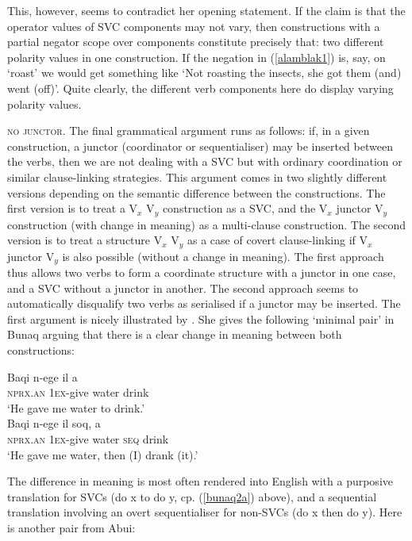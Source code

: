This, however, seems to contradict her opening statement. If the claim is that the operator values of SVC components may not vary, then constructions with a partial negator scope over components constitute precisely that: two different polarity values in one construction. If the negation in (\ref{alamblak1}) is, say, on `roast' we would get something like `Not roasting the insects, she got them (and) went (off)'. Quite clearly, the different verb components here do display varying polarity values.

\textsc{no junctor}. The final grammatical argument runs as follows: if, in a given construction, a junctor (coordinator or sequentialiser) may be inserted between the verbs, then we are not dealing with a SVC but with ordinary coordination or similar clause-linking strategies. This argument comes in two slightly different versions depending on the semantic difference between the constructions. The first version is to treat a V$_x$ V$_y$ construction as a SVC, and the V$_x$ junctor V$_y$ construction (with change in meaning) as a multi-clause construction. The second version is to treat a structure V$_x$ V$_y$ as a case of covert clause-linking if V$_x$ junctor V$_y$ is also possible (without a change in meaning). The first approach thus allows two verbs to form a coordinate structure with a junctor in one case, and a SVC without a junctor in another. The second approach seems to automatically disqualify two verbs as serialised if a junctor may be inserted. The first argument is nicely illustrated by \citet{schapper2009bunaq}. She gives the following `minimal pair' in Bunaq arguing that there is a clear change in meaning between both constructions:

\ea 
{}
\ea \label{bunaq2a}
\gll Baqi n-ege il a \\
\textsc{nprx}.\textsc{an} \textsc{1}\textsc{ex}-give water drink \\
\glft ‘He gave me water to drink.’ \\ 
\ex
\gll Baqi n-ege il soq, a \\ 
\textsc{nprx}.\textsc{an} \textsc{1}\textsc{ex}-give water \textsc{seq} drink \\
\glft ‘He gave me water, then (I) drank (it).’\\ 
\z
\z

The difference in meaning is most often rendered into English with a purposive translation for SVCs (do x to do y, cp. (\ref{bunaq2a}) above), and a sequential translation involving an overt sequentialiser for non-SVCs (do x then do y). Here is another pair from Abui:

